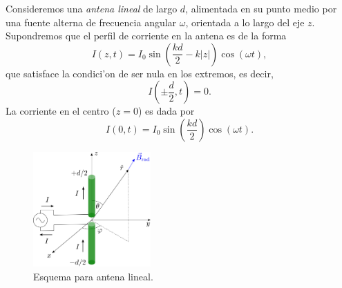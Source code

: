 Consideremos una \textit{antena lineal} de largo $d$, alimentada en su punto medio por una fuente alterna de frecuencia angular $\omega$, orientada a lo largo del eje $z$. Supondremos que el perfil de corriente en la antena es de la forma
\begin{equation}
 I(z,t)=I_0\sin\left(\frac{kd}{2}-k|z|\right)\cos(\omega t),
\end{equation}
que satisface la condici'on de ser nula en los extremos, es decir,
\begin{equation}
 I\left(\pm \frac{d}{2},t\right)=0.
\end{equation}
La corriente en el centro ($z=0$) es dada por
\begin{equation}
 I(0,t)=I_0\sin\left(\frac{kd}{2}\right)\cos(\omega t).
\end{equation}

\begin{figure}[H]
\centerline{\includegraphics[width=0.4\textwidth]{fig/fig-antena.pdf}}
 \caption{Esquema para antena lineal.}
\label{fig:antena}
\end{figure}

